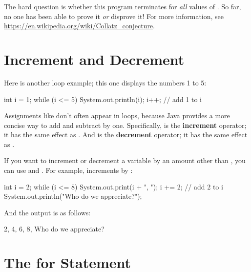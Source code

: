 The hard question is whether this program terminates for {\em all} values of .
So far, no one has been able to prove it {\em or} disprove it!
For more information, see \url{https://en.wikipedia.org/wiki/Collatz_conjecture}.


\section{Increment and Decrement}

Here is another  loop example; this one displays the numbers 1 to 5:

\begin{code}
int i = 1;
while (i <= 5) {
    System.out.println(i);
    i++;  // add 1 to i
}
\end{code}


Assignments like  don't often appear in loops, because Java provides a more concise way to add and subtract by one.
Specifically, \java{++} is the {\bf increment} operator; it has the same effect as .
And \java{--} is the {\bf decrement} operator; it has the same effect as .


If you want to increment or decrement a variable by an amount other than , you can use \java{+=} and \java{-=}.
For example,  increments  by :

\begin{code}
int i = 2;
while (i <= 8) {
    System.out.print(i + ", ");
    i += 2;  // add 2 to i
}
System.out.println("Who do we appreciate?");
\end{code}

And the output is as follows:

\begin{stdout}
2, 4, 6, 8, Who do we appreciate?
\end{stdout}


\section{The for Statement}

